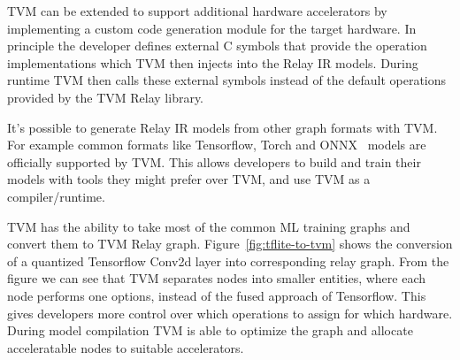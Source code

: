 \documentclass[12pt,a4paper,english
]{tunithesis}
\begin{document}
TVM can be extended to support additional hardware accelerators by implementing a custom code generation module for the target hardware. In principle the developer defines external C symbols that provide the operation implementations which TVM then injects into the Relay IR models. During runtime TVM then calls these external symbols instead of the default operations provided by the TVM Relay library.

It's possible to generate Relay IR models from other graph formats with TVM. For example common formats like Tensorflow, Torch and ONNX~\cite{onnxruntime} models are officially supported by TVM. This allows developers to build and train their models with tools they might prefer over TVM, and use TVM as a compiler/runtime.

TVM has the ability to take most of the common ML training graphs and convert them to TVM Relay graph. Figure~\ref{fig:tflite-to-tvm} shows the conversion of a quantized Tensorflow Conv2d layer into corresponding relay graph. From the figure we can see that TVM separates nodes into smaller entities, where each node performs one options, instead of the fused approach of Tensorflow. This gives developers more control over which operations to assign for which hardware.
During model compilation TVM is able to optimize the graph and allocate acceleratable nodes to suitable accelerators.~\parencite{TVM}
\end{document}
